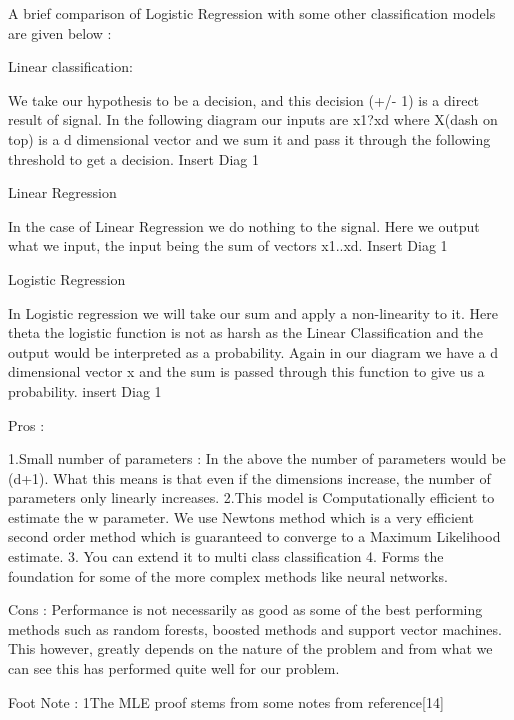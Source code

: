 A brief comparison of Logistic Regression with some other classification models are given below : 

Linear classification: 

We take our hypothesis to be a decision, and this decision (+/- 1) is a direct result of signal. In the following diagram our inputs are x1?xd where X(dash on top) is a d dimensional vector and we sum it and pass it through the following threshold to get a decision. Insert Diag 1 

Linear Regression 

In the case of Linear Regression we do nothing to the signal. Here we output what we input, the input being the sum of vectors x1..xd. Insert Diag 1

Logistic Regression 

In Logistic regression we will take our sum and apply a non-linearity to it. Here theta the logistic function is not as harsh as the Linear Classification and the output would be interpreted as a probability. Again in our diagram we have a d dimensional vector x and the sum is passed through this function to give us a probability.  insert Diag 1


Pros : 

1.Small number of parameters : In the above the number of parameters would be (d+1). What this means is that even if the dimensions increase, the number of parameters only linearly increases. 
2.This model is Computationally efficient to estimate the w parameter. We use Newtons method  
      which is a very efficient second order method which is guaranteed to converge to a Maximum    Likelihood estimate. 
3. You can extend it to multi class classification
4. Forms the foundation for some of the more complex methods like neural networks.

Cons : 
Performance is not necessarily as good as some of the best performing methods such as random forests, boosted methods and support vector machines. This however, greatly depends on the nature of the problem and from what we can see this has performed quite well for our problem. 

Foot Note : 1The MLE proof stems from some notes from reference[14]